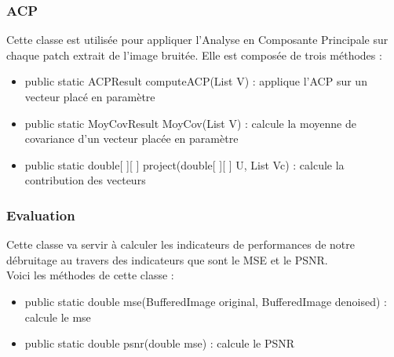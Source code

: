 \subsubsection{ACP}
Cette classe est utilisée pour appliquer l'Analyse en Composante Principale sur chaque patch extrait de l'image bruitée.
Elle est composée de trois méthodes :
\begin{itemize}
    \item public static ACPResult computeACP(List V) : applique l'ACP sur un vecteur placé en paramètre
    \item public static MoyCovResult MoyCov(List V) : calcule la moyenne de covariance d'un vecteur placée en paramètre
    \item public static double[ ][ ] project(double[ ][ ] U, List Vc) : calcule la contribution des vecteurs
\end{itemize}


\subsubsection{Evaluation}
Cette classe va servir à calculer les indicateurs de performances de notre débruitage au travers des indicateurs que sont le MSE et le PSNR. \\
Voici les méthodes de cette classe :
\begin{itemize}
    \item public static double mse(BufferedImage original, BufferedImage denoised) : calcule le mse
    \item public static double psnr(double mse) : calcule le PSNR
\end{itemize}

